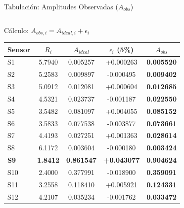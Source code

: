 


\begin{frame}{Tabulación: Amplitudes Observadas ($A_{obs}$)}

    \begin{columns}[T]
        \begin{block}{Cálculo: $A_{obs,i} = A_{ideal,i} + \epsilon_i$}
            \centering
            \scriptsize 
            \begin{tabular}{@{}lcccc@{}}
                \toprule
                \textbf{Sensor} & \textbf{$R_i$} & \textbf{$A_{ideal}$} & \textbf{$\epsilon_i$ (5\%)} & \textbf{$A_{obs}$} \\ \midrule
                S1  & 5.7940 & 0.005257 & +0.000263 & \textbf{0.005520} \\
                S2  & 5.2583 & 0.009897 & -0.000495 & \textbf{0.009402} \\
                S3  & 5.0912 & 0.012081 & +0.000604 & \textbf{0.012685} \\
                S4  & 4.5321 & 0.023737 & -0.001187 & \textbf{0.022550} \\
                S5  & 3.5482 & 0.081097 & +0.004055 & \textbf{0.085152} \\
                S6  & 3.5833 & 0.077538 & -0.003877 & \textbf{0.073661} \\
                S7  & 4.4193 & 0.027251 & +0.001363 & \textbf{0.028614} \\
                S8  & 6.1172 & 0.003604 & -0.000180 & \textbf{0.003424} \\
                \textbf{S9} & \textbf{1.8412} & \textbf{0.861547} & \textbf{+0.043077} & \textbf{0.904624} \\
                S10 & 2.4000 & 0.377991 & -0.018900 & \textbf{0.359091} \\
                S11 & 3.2558 & 0.118410 & +0.005921 & \textbf{0.124331} \\
                S12 & 4.2107 & 0.035234 & -0.001762 & \textbf{0.033472} \\ \bottomrule
            \end{tabular}
        \end{block}


\end{columns}
\end{frame}
